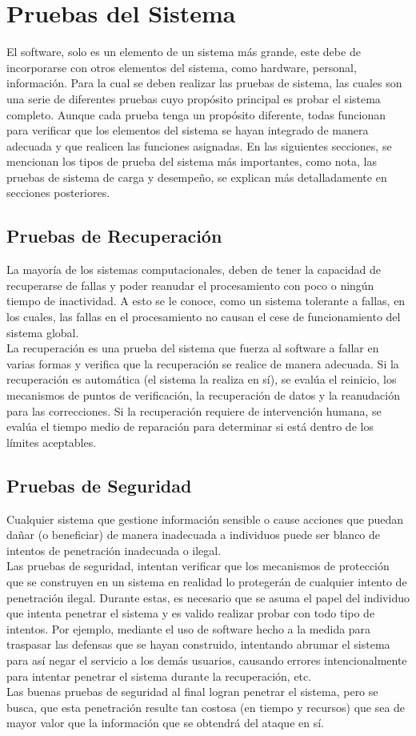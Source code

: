 \section{Pruebas del Sistema}
El software, solo es un elemento de un sistema más grande, este debe de incorporarse con otros elementos del sistema, como hardware, personal, información. Para la cual se deben realizar las pruebas de sistema, las cuales son una serie de diferentes pruebas cuyo propósito principal es probar el sistema completo. Aunque cada prueba tenga un propósito diferente, todas funcionan para verificar que los elementos del sistema se hayan integrado de manera adecuada y que realicen las funciones asignadas.
En las siguientes secciones, se mencionan los tipos de prueba del sistema más importantes, como nota, las pruebas de sistema de carga y desempeño, se explican más detalladamente en secciones posteriores. 
\subsection{Pruebas de Recuperación}
La mayoría de los sistemas computacionales, deben de tener la capacidad de recuperarse de fallas y poder reanudar el procesamiento con poco o ningún tiempo de inactividad. A esto se le conoce, como un sistema tolerante a fallas, en los cuales, las fallas en el procesamiento no causan el cese de funcionamiento del sistema global.\\ La recuperación es una prueba del sistema que fuerza al software a fallar en varias formas y verifica que la recuperación se realice de manera adecuada. Si la recuperación es automática (el sistema la realiza en sí), se evalúa el reinicio, los mecanismos de puntos de verificación, la recuperación de datos y la reanudación para las correcciones. Si la recuperación requiere de intervención humana, se evalúa el tiempo medio de reparación para determinar si está dentro de los límites aceptables.
\subsection{Pruebas de Seguridad}
Cualquier sistema que gestione información sensible o cause acciones que puedan dañar (o beneficiar) de manera inadecuada a individuos puede ser blanco de intentos de penetración inadecuada o ilegal.\\
Las pruebas de seguridad, intentan verificar que los mecanismos de protección que se construyen en un sistema en realidad lo protegerán de cualquier intento de penetración ilegal. Durante estas, es necesario que se asuma el papel del individuo que intenta penetrar el sistema y es valido realizar probar con todo tipo de intentos. Por ejemplo, mediante el uso de software hecho a la medida para traspasar las defensas que se hayan construido, intentando abrumar el sistema para así negar el servicio a los demás usuarios, causando errores intencionalmente para intentar penetrar el sistema durante la recuperación, etc.\\ Las buenas pruebas de seguridad al final logran penetrar el sistema, pero se busca, que esta penetración resulte tan costosa (en tiempo y recursos) que sea de mayor valor que la información que se obtendrá del ataque en sí.
